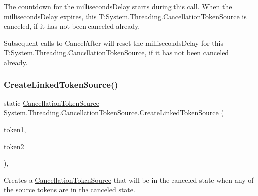 The countdown for the milliseconds\+Delay starts during this call. When the milliseconds\+Delay expires, this T\+:\+System.\+Threading.\+Cancellation\+Token\+Source is canceled, if it has not been canceled already. 

Subsequent calls to Cancel\+After will reset the milliseconds\+Delay for this T\+:\+System.\+Threading.\+Cancellation\+Token\+Source, if it has not been canceled already. \mbox{\label{class_system_1_1_threading_1_1_cancellation_token_source_a7c4b574cce3267bac2e4996ec64bb2eb}} 
\subsubsection{\texorpdfstring{Create\+Linked\+Token\+Source()}{CreateLinkedTokenSource()}\hspace{0.1cm}{\footnotesize\ttfamily [1/2]}}
{\footnotesize\ttfamily static \hyperlink{class_system_1_1_threading_1_1_cancellation_token_source}{Cancellation\+Token\+Source} System.\+Threading.\+Cancellation\+Token\+Source.\+Create\+Linked\+Token\+Source (\begin{DoxyParamCaption}\item[{\hyperlink{struct_system_1_1_threading_1_1_cancellation_token}{Cancellation\+Token}}]{token1,  }\item[{\hyperlink{struct_system_1_1_threading_1_1_cancellation_token}{Cancellation\+Token}}]{token2 }\end{DoxyParamCaption})\hspace{0.3cm}{\ttfamily [inline]}, {\ttfamily [static]}}



Creates a \hyperlink{}{Cancellation\+Token\+Source} that will be in the canceled state when any of the source tokens are in the canceled state. 


